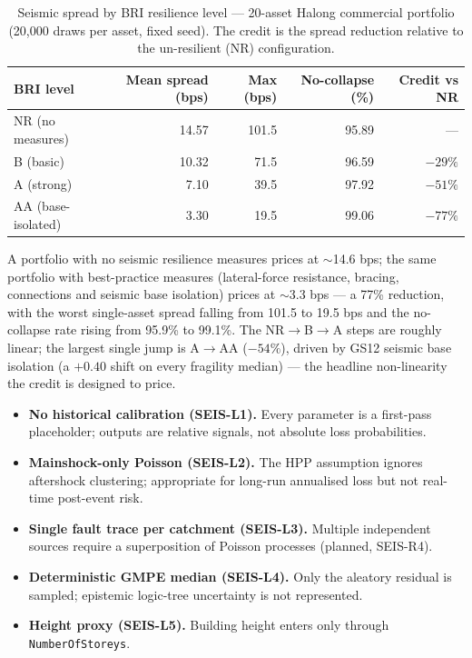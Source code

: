 \documentclass[11pt,a4paper]{article}
\begin{document}
\begin{table}[H]
  \centering
  \caption{Seismic spread by BRI resilience level --- 20-asset Halong commercial
  portfolio (20{,}000 draws per asset, fixed seed). The credit is the spread
  reduction relative to the un-resilient (NR) configuration.}
  \label{tab:seis_portfolio_resilience}
  \begin{tabular}{lrrrr}
    \toprule
    \textbf{BRI level} & \textbf{Mean spread (bps)} & \textbf{Max (bps)} &
    \textbf{No-collapse (\%)} & \textbf{Credit vs NR} \\
    \midrule
    NR (no measures)        & 14.57 & 101.5 & 95.89 & ---        \\
    B (basic)               & 10.32 &  71.5 & 96.59 & $-29\%$    \\
    A (strong)              &  7.10 &  39.5 & 97.92 & $-51\%$    \\
    AA (base-isolated)      &  3.30 &  19.5 & 99.06 & $-77\%$    \\
    \bottomrule
  \end{tabular}
\end{table}

A portfolio with no seismic resilience measures prices at $\sim$14.6 bps; the
same portfolio with best-practice measures (lateral-force resistance, bracing,
connections and seismic base isolation) prices at $\sim$3.3 bps --- a 77\%
reduction, with the worst single-asset spread falling from 101.5 to 19.5 bps and
the no-collapse rate rising from 95.9\% to 99.1\%. The NR$\to$B$\to$A steps are
roughly linear; the largest single jump is A$\to$AA ($-54\%$), driven by GS12
seismic base isolation (a $+0.40$ shift on every fragility median) --- the
headline non-linearity the credit is designed to price.

\mkmlimitations

\begin{itemize}
  \item \textbf{No historical calibration (SEIS-L1).} Every parameter is a
        first-pass placeholder; outputs are relative signals, not absolute loss
        probabilities.
  \item \textbf{Mainshock-only Poisson (SEIS-L2).} The HPP assumption ignores
        aftershock clustering; appropriate for long-run annualised loss but not
        real-time post-event risk.
  \item \textbf{Single fault trace per catchment (SEIS-L3).} Multiple
        independent sources require a superposition of Poisson processes
        (planned, SEIS-R4).
  \item \textbf{Deterministic GMPE median (SEIS-L4).} Only the aleatory residual
        is sampled; epistemic logic-tree uncertainty is not represented.
  \item \textbf{Height proxy (SEIS-L5).} Building height enters only through
        \texttt{NumberOfStoreys}.
\end{itemize}
\end{document}
